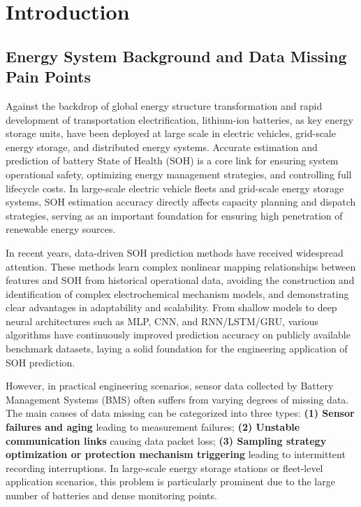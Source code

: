 \documentclass[5p,times]{elsarticle}
\begin{document}
\section{Introduction}\label{sec:intro}

\subsection{Energy System Background and Data Missing Pain Points}

Against the backdrop of global energy structure transformation and rapid development of transportation electrification, lithium-ion batteries, as key energy storage units, have been deployed at large scale in electric vehicles, grid-scale energy storage, and distributed energy systems. Accurate estimation and prediction of battery State of Health (SOH) is a core link for ensuring system operational safety, optimizing energy management strategies, and controlling full lifecycle costs. In large-scale electric vehicle fleets and grid-scale energy storage systems, SOH estimation accuracy directly affects capacity planning and dispatch strategies, serving as an important foundation for ensuring high penetration of renewable energy sources.

In recent years, data-driven SOH prediction methods have received widespread attention\cite{luo2022review}. These methods learn complex nonlinear mapping relationships between features and SOH from historical operational data, avoiding the construction and identification of complex electrochemical mechanism models, and demonstrating clear advantages in adaptability and scalability. From shallow models to deep neural architectures such as MLP, CNN, and RNN/LSTM/GRU, various algorithms have continuously improved prediction accuracy on publicly available benchmark datasets\cite{liu2025deep}, laying a solid foundation for the engineering application of SOH prediction.

However, in practical engineering scenarios, sensor data collected by Battery Management Systems (BMS) often suffers from varying degrees of missing data. The main causes of data missing can be categorized into three types: \textbf{(1) Sensor failures and aging} leading to measurement failures; \textbf{(2) Unstable communication links} causing data packet loss; \textbf{(3) Sampling strategy optimization or protection mechanism triggering} leading to intermittent recording interruptions. In large-scale energy storage stations or fleet-level application scenarios, this problem is particularly prominent due to the large number of batteries and dense monitoring points.
\end{document}
